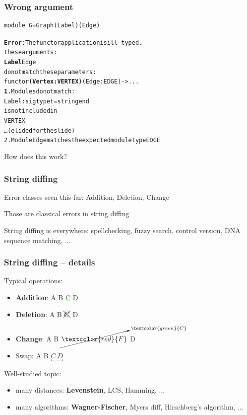 \documentclass[11pt,aspectratio=169]{beamer}
\newcommand{\error}[1]{\textcolor{red}{#1}}
\newcommand{\ok}[1]{\textcolor{green}{#1}}
\begin{document}
\begin{frame}[fragile]\frametitle{Wrong argument}
\begin{verbatim}
module G=Graph(Label)(Edge)
\end{verbatim}
\begin{alltt}
{\bfseries{}\color{red}{}Error}: The functor application is ill-typed.
       These arguments:
         {\color{magenta}{}\bfseries{}Label} {\color{green}{}Edge}
       do not match these parameters:
         functor {\color{magenta}{}\bfseries{}(Vertex : VERTEX)} {\color{green}{}(Edge : EDGE)} -> ...
  {\color{magenta}{}\bfseries{}1.} Modules do not match:
       Label : sig type t = string end
     is not included in
       VERTEX
     \dots(elided for the slide)
  {\color{green}{}2.} Module Edge matches the expected module type EDGE

\end{alltt}
\end{frame}

\begin{frame}[standout]
  \centering \Huge How does this work?
\end{frame}
\begin{frame}\frametitle{String diffing}
\begin{block}{}
  Error classes seen this far: Addition, Deletion, Change
\end{block}
\begin{block}{}
   Those are classical errors in string diffing
 \end{block}
 \begin{block}{}String diffing is everywhere:
   spellchecking, fuzzy search, control version, DNA sequence matching, ...
 \end{block}

\end{frame}

\begin{frame}\frametitle{String diffing -- details}
  Typical operations:
  \begin{itemize}
    \item \textbf<2->{Addition}: A B \ok{\underline{C}} D
    \item \textbf<2->{Deletion}: A B \error{$\xcancel{C}$} D
    \item \textbf<2->{Change}: A B $\cancelto{\ok{C}}{\error{F}}$ D
    \item Swap: A B $\underset{\longleftrightarrow}{C\ D}$
  \end{itemize}
  Well-studied topic:
  \begin{itemize}
    \item many distances: \textbf<3>{Levenstein}, LCS, Hamming, ...
     \item many algorithms: \textbf<3>{Wagner-Fischer}, Myers diff, Hirschberg's algorithm, ...
  \end{itemize}
\end{frame}
\end{document}
